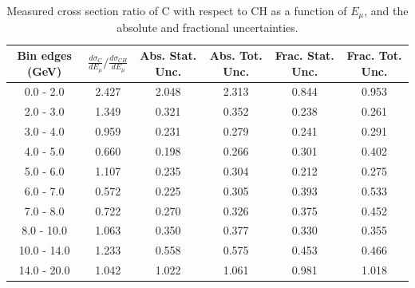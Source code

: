 \documentclass[aps,prl,twocolumn,superscriptaddress,nofootinbib]{revtex4-1}
\begin{document}
\begin{table}[h!]
  \centering
  \caption{Measured cross section ratio of C with respect to CH as a function
  of $E_{\mu}$,  and the absolute and fractional uncertainties.}
    \begin{tabular}{c||c||c|c||c|c}
      Bin edges (GeV) & $\frac{d\sigma_{C}}{dE_{\mu}}/\frac{d\sigma_{CH}}{dE_{\mu}}$ & Abs. Stat. Unc. & Abs. Tot. Unc. & Frac. Stat. Unc. & Frac. Tot. Unc. \\
      \hline\hline
        0.0 - 2.0 & 2.427 & 2.048 & 2.313 & 0.844 & 0.953 \\
        2.0 - 3.0 & 1.349 & 0.321 & 0.352 & 0.238 & 0.261 \\
        3.0 - 4.0 & 0.959 & 0.231 & 0.279 & 0.241 & 0.291 \\
        4.0 - 5.0 & 0.660 & 0.198 & 0.266 & 0.301 & 0.402 \\
        5.0 - 6.0 & 1.107 & 0.235 & 0.304 & 0.212 & 0.275 \\
        6.0 - 7.0 & 0.572 & 0.225 & 0.305 & 0.393 & 0.533 \\
        7.0 - 8.0 & 0.722 & 0.270 & 0.326 & 0.375 & 0.452 \\
       8.0 - 10.0 & 1.063 & 0.350 & 0.377 & 0.330 & 0.355 \\
      10.0 - 14.0 & 1.233 & 0.558 & 0.575 & 0.453 & 0.466 \\
      14.0 - 20.0 & 1.042 & 1.022 & 1.061 & 0.981 & 1.018 \\
    \end{tabular}
  \label{table:EmuXSecRatio_C}
\end{table}
\end{document}
